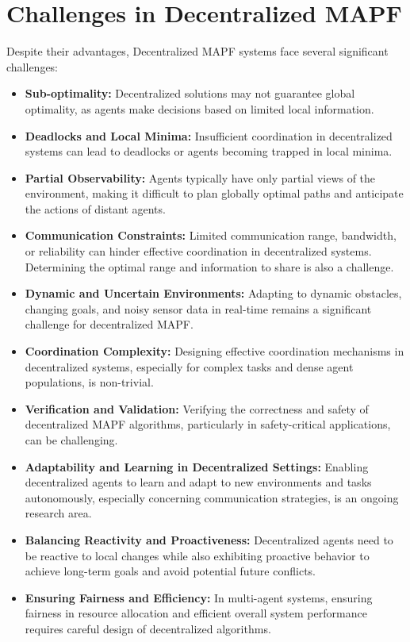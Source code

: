 \section{Challenges in Decentralized MAPF}
Despite their advantages, Decentralized MAPF systems face several significant challenges:
\begin{itemize}
    \item \textbf{Sub-optimality:} Decentralized solutions may not guarantee global optimality, as agents make decisions based on limited local information.
    \item \textbf{Deadlocks and Local Minima:} Insufficient coordination in decentralized systems can lead to deadlocks or agents becoming trapped in local minima.
    \item \textbf{Partial Observability:} Agents typically have only partial views of the environment, making it difficult to plan globally optimal paths and anticipate the actions of distant agents.
    \item \textbf{Communication Constraints:} Limited communication range, bandwidth, or reliability can hinder effective coordination in decentralized systems. Determining the optimal range and information to share is also a challenge.
    \item \textbf{Dynamic and Uncertain Environments:} Adapting to dynamic obstacles, changing goals, and noisy sensor data in real-time remains a significant challenge for decentralized MAPF.
    \item \textbf{Coordination Complexity:} Designing effective coordination mechanisms in decentralized systems, especially for complex tasks and dense agent populations, is non-trivial.
    \item \textbf{Verification and Validation:} Verifying the correctness and safety of decentralized MAPF algorithms, particularly in safety-critical applications, can be challenging.
    \item \textbf{Adaptability and Learning in Decentralized Settings:} Enabling decentralized agents to learn and adapt to new environments and tasks autonomously, especially concerning communication strategies, is an ongoing research area.
    \item \textbf{Balancing Reactivity and Proactiveness:} Decentralized agents need to be reactive to local changes while also exhibiting proactive behavior to achieve long-term goals and avoid potential future conflicts.
    \item \textbf{Ensuring Fairness and Efficiency:} In multi-agent systems, ensuring fairness in resource allocation and efficient overall system performance requires careful design of decentralized algorithms.
\end{itemize}

